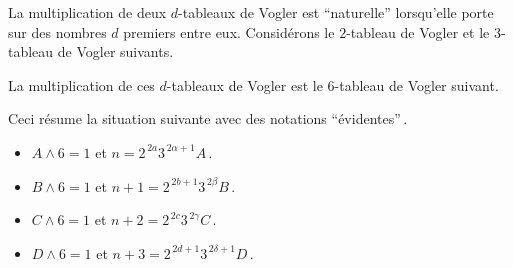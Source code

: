 \begin{example}
	La multiplication de deux $d$-tableaux de Vogler est \enquote{naturelle} lorsqu'elle porte sur des nombres $d$ premiers entre eux.
	Considérons le $2$-tableau de Vogler et le $3$-tableau de Vogler suivants.
	
	\begin{multicols}{2}
	\begin{center}
	\end{center}

	\begin{center}
	\end{center}
	\end{multicols}


	La multiplication de ces $d$-tableaux de Vogler est le $6$-tableau de Vogler suivant.

	\begin{center}
	\end{center}
	
	Ceci résume la situation suivante avec des notations \enquote{évidentes}\,. 
	
	\begin{itemize}
		\item $A \wedge 6 = 1$
		      et
		      $n     = 2^{\,2a}   3^{\,2\alpha+1} A$\,.

		\item $B \wedge 6 = 1$
		      et
		      $n + 1 = 2^{\,2b+1} 3^{\,2\beta}    B$\,.

		\item $C \wedge 6 = 1$
		      et
		      $n + 2 = 2^{\,2c}   3^{\,2\gamma}   C$\,.

		\item $D \wedge 6 = 1$
		      et
		      $n + 3 = 2^{\,2d+1} 3^{\,2\delta+1} D$\,.
	\end{itemize}
\end{example}


